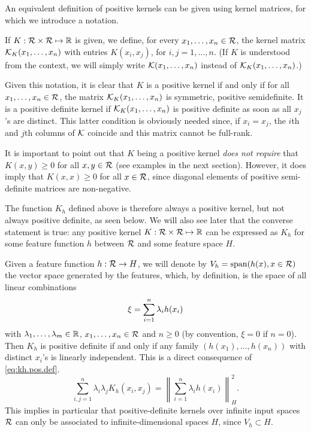 An equivalent definition of positive kernels can be given using kernel matrices, for which we introduce a notation.
\begin{definition}
\label{def:kernel.mat}
If $K: {\mathcal R} \times{\mathcal R} \mapsto {\mathbb{R}}$ is given, we define, for every $x_1, \ldots, x_n\in {\mathcal R}$, the kernel matrix 
${\mathcal K}_K(x_1, \ldots, x_n)$ with entries $K(x_i, x_j)$, for $i,j = 1, \ldots, n$. (If $K$ is understood from the context, we will simply write ${\mathcal K}(x_1, \ldots, x_n)$ instead of ${\mathcal K}_K(x_1, \ldots, x_n)$.)
\end{definition}
Given this notation, it is clear that $K$ is a positive kernel if and only if  for all $x_1, \ldots, x_n\in {\mathcal R}$, the matrix ${\mathcal K}_K(x_1, \ldots, x_n)$ is symmetric, positive semidefinite. It is a positive definite kernel if ${\mathcal K}_K(x_1, \ldots, x_n)$ is positive definite as soon as all $x_j$'s are distinct. This latter condition is obviously needed since, if $x_i=x_j$, the $i$th and $j$th columns of ${\mathcal K}$ coincide and this matrix cannot be full-rank.

\begin{remark}
\label{rem:positive.kernel}
It is important to point out that $K$ being a positive kernel {\em does not require} that $K(x,y) \geq 0$ for all $x,y\in{\mathcal R}$ (see examples in the next section). However, it does imply that $K(x,x) \geq 0$ for all $x\in {\mathcal R}$, since diagonal elements of positive semi-definite matrices are non-negative.
\end{remark}

\bigskip

The function $K_h$ defined above is therefore always a positive kernel, but not always positive definite, as seen below. We will also see later that the converse statement is true: any positive kernel $K: {\mathcal R} \times{\mathcal R} \mapsto {\mathbb{R}}$ can be expressed as $K_{h}$ for some feature function $h$ between ${\mathcal R}$ and some feature space $H$.


Given a feature function $h: {\mathcal R} \to H$, we will denote by $V_h = \mathrm{span}(h(x), x\in{\mathcal R})$ the vector space generated by the features, which, by definition, is the space of all linear combinations
\[
\xi = \sum_{i=1}^n \lambda_i h(x_i)
\]
with $\lambda_1, \ldots, \lambda_m\in{\mathbb{R}}$, $x_1, \ldots, x_n\in {\mathcal R}$ and $n\geq 0$ (by convention, $\xi=0$ if $n=0$). Then $K_h$ is positive definite if and only if any family $(h(x_1), \ldots, h(x_n))$ with distinct $x_i$'s is linearly independent. This is a direct consequence of  \cref{eq:kh.pos.def}.
\[
\sum_{i,j=1}^n \lambda_i \lambda_j K_h(x_i, x_j) =  \left\|\sum_{i=1}^n \lambda_i h(x_i)\right\|_H^2.
\]
This implies in particular that positive-definite kernels over infinite input spaces ${\mathcal R}$ can only be associated to infinite-dimensional spaces $H$, since $V_h\subset H$. 



